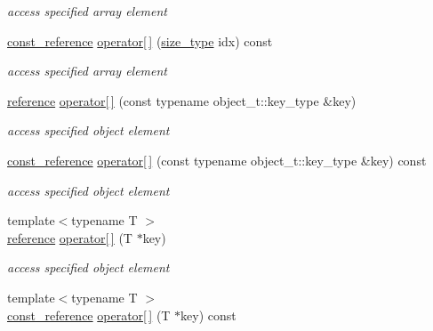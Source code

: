 \begin{DoxyCompactItemize}
\begin{DoxyCompactList}\small\item\em access specified array element \end{DoxyCompactList}\item 
\hyperlink{classnlohmann_1_1basic__json_ab8a1c33ee7b154fc41ca2545aa9724e6}{const\+\_\+reference} \hyperlink{classnlohmann_1_1basic__json_ad21d96f490fa1aa8605fba8dadcce319}{operator\mbox{[}$\,$\mbox{]}} (\hyperlink{classnlohmann_1_1basic__json_a3ada29bca70b4965f6fd37ec1c8f85f7}{size\+\_\+type} idx) const
\begin{DoxyCompactList}\small\item\em access specified array element \end{DoxyCompactList}\item 
\hyperlink{classnlohmann_1_1basic__json_a220ae98554a76205fb7f8822d36b2d5a}{reference} \hyperlink{classnlohmann_1_1basic__json_a3f45f3820c456ad2e3f3df2926564151}{operator\mbox{[}$\,$\mbox{]}} (const typename object\+\_\+t\+::key\+\_\+type \&key)
\begin{DoxyCompactList}\small\item\em access specified object element \end{DoxyCompactList}\item 
\hyperlink{classnlohmann_1_1basic__json_ab8a1c33ee7b154fc41ca2545aa9724e6}{const\+\_\+reference} \hyperlink{classnlohmann_1_1basic__json_acb5b489310f4e0ce2d5fb29b73fb59d3}{operator\mbox{[}$\,$\mbox{]}} (const typename object\+\_\+t\+::key\+\_\+type \&key) const
\begin{DoxyCompactList}\small\item\em access specified object element \end{DoxyCompactList}\item 
{\footnotesize template$<$typename T $>$ }\\\hyperlink{classnlohmann_1_1basic__json_a220ae98554a76205fb7f8822d36b2d5a}{reference} \hyperlink{classnlohmann_1_1basic__json_abc94831476f7b4d3efe6f2e9036c7188}{operator\mbox{[}$\,$\mbox{]}} (T $\ast$key)
\begin{DoxyCompactList}\small\item\em access specified object element \end{DoxyCompactList}\item 
{\footnotesize template$<$typename T $>$ }\\\hyperlink{classnlohmann_1_1basic__json_ab8a1c33ee7b154fc41ca2545aa9724e6}{const\+\_\+reference} \hyperlink{classnlohmann_1_1basic__json_a11bbe874496eb7b29a5549e0637de59e}{operator\mbox{[}$\,$\mbox{]}} (T $\ast$key) const

\end{DoxyCompactItemize}
